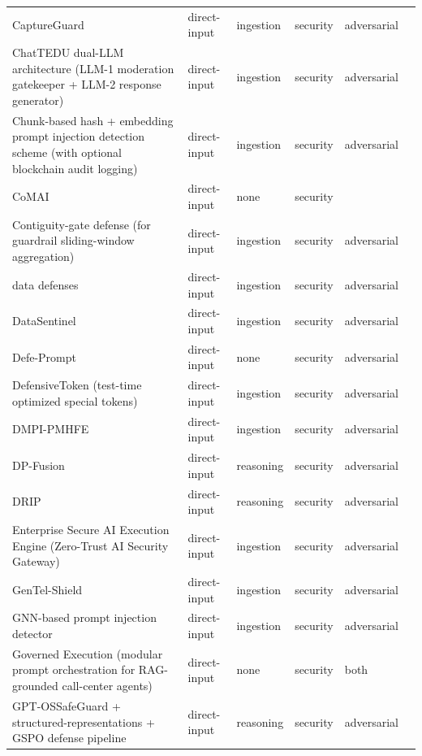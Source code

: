 \begin{longtable}{@{}p{}lllll@{}}
CaptureGuard & direct-input & ingestion & security & adversarial & \cite{kholkar-2025-capture} \\
ChatTEDU dual-LLM architecture (LLM-1 moderation gatekeeper + LLM-2 response generator) & direct-input & ingestion & security & adversarial & \cite{emekci-2025-securing} \\
Chunk-based hash + embedding prompt injection detection scheme (with optional blockchain audit logging) & direct-input & ingestion & security & adversarial & \cite{hao-2025-privacypreserving} \\
CoMAI & direct-input & none & security &  & \cite{sun-2026-comai} \\
Contiguity-gate defense (for guardrail sliding-window aggregation) & direct-input & ingestion & security & adversarial & \cite{zhou-2026-prompt} \\
data defenses & direct-input & ingestion & security & adversarial & \cite{agnew-2024-data} \\
DataSentinel & direct-input & ingestion & security & adversarial & \cite{liu-2025-datasentinel} \\
Defe-Prompt & direct-input & none & security & adversarial & \cite{ren-2024-f2a} \\
DefensiveToken (test-time optimized special tokens) & direct-input & ingestion & security & adversarial & \cite{chen-2025-defending} \\
DMPI-PMHFE & direct-input & ingestion & security & adversarial & \cite{ji-2025-detection} \\
DP-Fusion & direct-input & reasoning & security & adversarial & \cite{thareja-2025-dpfusion} \\
DRIP & direct-input & reasoning & security & adversarial & \cite{liu-2025-drip} \\
Enterprise Secure AI Execution Engine (Zero-Trust AI Security Gateway) & direct-input & ingestion & security & adversarial & \cite{krishna-2026-enterprise} \\
GenTel-Shield & direct-input & ingestion & security & adversarial & \cite{li-2024-gentelsafe} \\
GNN-based prompt injection detector & direct-input & ingestion & security & adversarial & \cite{jadhav-2025-novel} \\
Governed Execution (modular prompt orchestration for RAG-grounded call-center agents) & direct-input & none & security & both & \cite{pachtrachai-2026-transcripts} \\
GPT-OSSafeGuard + structured-representations + GSPO defense pipeline & direct-input & reasoning & security & adversarial & \cite{gudinorosero-2025-prompt} \\

\end{longtable}
